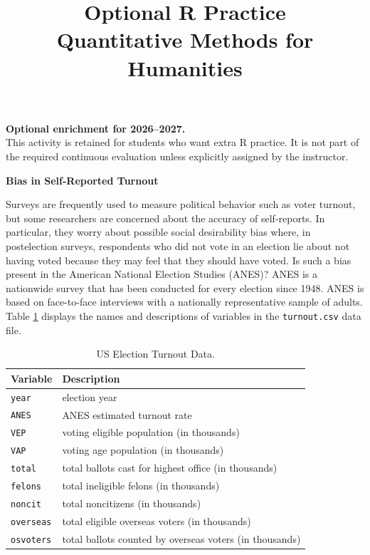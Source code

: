 \documentclass[12pt]{article}
\author{\empty}
\title{Optional R Practice \\ Quantitative Methods for Humanities}
\date{\empty}
\begin{document}
\maketitle

\begin{center}
    \textbf{Optional enrichment for 2026--2027.}\\
    This activity is retained for students who want extra R practice. It is not part of the required continuous evaluation unless explicitly assigned by the instructor.
\end{center}
\vspace{0.3cm}

\begin{center}
    \textbf{Bias in Self-Reported Turnout}    
\end{center}

Surveys are frequently used to measure political behavior such as voter turnout, but some researchers are concerned about the accuracy of self-reports. In particular, they worry about possible social desirability bias where, in postelection surveys, respondents who did not vote in an election lie about not having voted because they may feel that they should have voted. Is such a bias present in the American National Election Studies (ANES)? ANES is a nationwide survey that has been conducted for every election since 1948. ANES is based on face-to-face interviews with a nationally representative sample of adults. Table \ref{table:US_election} displays the names and descriptions of variables in the \texttt{turnout.csv} data file.

\begin{table}[h!]
\centering
\caption{US Election Turnout Data.}
\label{table:US_election}
\begin{tabular}{ll}
\hline
\textbf{Variable} & \textbf{Description} \\ \hline
\texttt{year} & election year \\
\texttt{ANES} & ANES estimated turnout rate \\
\texttt{VEP} & voting eligible population (in thousands) \\
\texttt{VAP} & voting age population (in thousands) \\
\texttt{total} & total ballots cast for highest office (in thousands) \\
\texttt{felons} & total ineligible felons (in thousands) \\
\texttt{noncit} & total noncitizens (in thousands) \\
\texttt{overseas} & total eligible overseas voters (in thousands) \\
\texttt{osvoters} & total ballots counted by overseas voters (in thousands) \\ \hline
\end{tabular}
\end{table}
\end{document}
